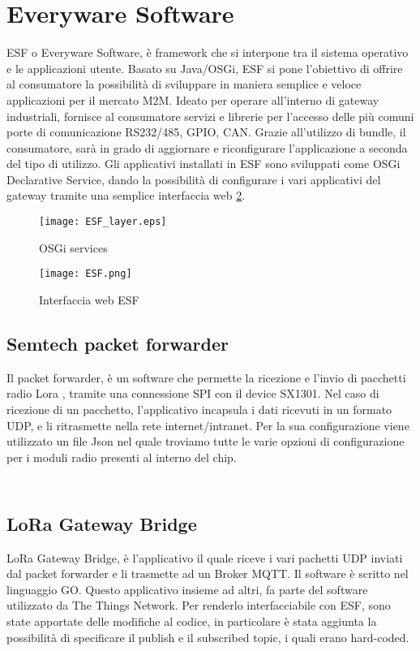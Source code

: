 \section{Everyware Software}
ESF o Everyware Software, è framework che si interpone tra il sistema operativo
e le applicazioni utente. Basato su Java/OSGi, ESF si pone l'obiettivo di
offrire al consumatore la possibilità di sviluppare in maniera semplice e veloce
applicazioni per il mercato M2M.  Ideato per operare all'interno di gateway
industriali, fornisce al consumatore servizi e librerie per l'accesso delle più
comuni porte di comunicazione RS232/485, GPIO, CAN.  Grazie all'utilizzo di
bundle, il consumatore, sarà in grado di aggiornare e riconfigurare
l'applicazione a seconda del tipo di utilizzo. Gli applicativi installati in ESF
sono sviluppati come OSGi Declarative Service, dando la possibilità di
configurare i vari applicativi del gateway tramite una semplice interfaccia web
\ref{fig:ESF_web}.
\begin{figure}[h]
        \centering 
                \texttt{[image: ESF\_layer.eps]}
        \caption{OSGi services}
        \label{}
\end{figure}


\begin{figure}[h]
        \centering 
                \texttt{[image: ESF.png]}
                \caption{Interfaccia web ESF}
        \label{fig:ESF_web}
\end{figure}

\subsection{Semtech packet forwarder}
Il packet forwarder, è un software che permette la ricezione e l'invio di pacchetti radio Lora ,
tramite una connessione SPI con il device SX1301. Nel caso di ricezione di un
pacchetto, l'applicativo incapsula i dati ricevuti in un formato UDP, e li
ritrasmette nella rete internet/intranet. Per la sua configurazione viene
utilizzato un file Json nel quale troviamo tutte le varie opzioni di
configurazione per i moduli radio presenti al interno del chip.
\inputminted[mathescape, gobble=2, frame=lines, linenos=true
framesep=2mm, firstline=1,lastline=23]{json}{Code_Files/global_json.conf}
\inputminted[mathescape, gobble=2, frame=lines, linenos=true
framesep=2mm, firstline=173,lastline=184]{json}{Code_Files/global_json.conf}

\subsection{LoRa Gateway Bridge}
LoRa Gateway Bridge, è l'applicativo il quale riceve i vari pachetti UDP inviati
dal packet forwarder e li trasmette ad un Broker MQTT. Il software è scritto nel
linguaggio GO. Questo applicativo insieme ad altri, fa parte del software utilizzato da The Things
Network. Per renderlo interfacciabile con ESF, sono state apportate delle 
modifiche al codice, in particolare è stata aggiunta la possibilità di
specificare il publish e il subscribed topic, i quali erano hard-coded.



